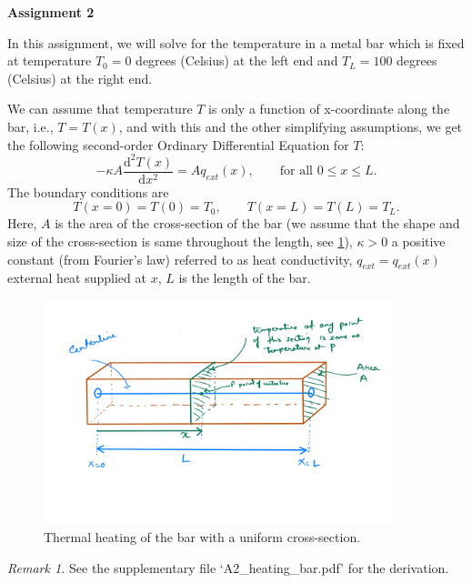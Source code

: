 \documentclass[11pt,a4paper]{report}
\newcommand{\dd}{\mathrm{d}}
\begin{document}
\begin{center} 
\textbf{Assignment 2} 
\end{center}

In this assignment, we will solve for the temperature in a metal bar which is fixed at temperature $T_0 = 0$ degrees (Celsius) at the left end and $T_L = 100$ degrees (Celsius) at the right end.  

We can assume that temperature $T$ is only a function of x-coordinate along the bar, i.e., $T = T(x)$, and with this and the other simplifying assumptions, we get the following second-order Ordinary Differential Equation for $T$:
\begin{equation}\label{eq:ode}
-\kappa A \frac{\dd^2 T(x)}{\dd x^2} = A q_{ext}(x), \qquad \text{for all } 0 \leq x \leq L .
\end{equation}
The boundary conditions are
\begin{equation}\label{eq:bc}
T(x=0) = T(0) = T_0, \qquad T(x=L) = T(L) = T_L .
\end{equation}
Here, $A$ is the area of the cross-section of the bar (we assume that the shape and size of the cross-section is same throughout the length, see \cref{fig:bar}), $\kappa > 0 $ a positive constant (from Fourier's law) referred to as heat conductivity, $q_{ext}  =q_{ext}(x)$ external heat supplied at $x$, $L$ is the length of the bar. 

\begin{figure}[H]
\centering
\includegraphics[width=0.9\textwidth]{Draw Bar.pdf}
\caption{Thermal heating of the bar with a uniform cross-section.}\label{fig:bar}
\end{figure}

\vspace{10pt}
\noindent\textit{Remark 1.} See the supplementary file `A2\_heating\_bar.pdf' for the derivation.
\end{document}
